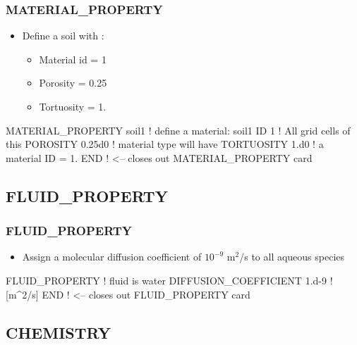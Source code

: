 \documentclass{beamer}
\newcommand\redcomment[1]{{{\color{red} #1}}}
\newcommand\bluecomment[1]{{{\color{blue} #1}}}
\newcommand\greencomment[1]{{{\color{green} #1}}}
\begin{document}
\begin{frame}\frametitle{MATERIAL\_PROPERTY}

\begin{itemize}
  \item Define a soil with :
  \begin{itemize}
    \item Material id = 1
    \item Porosity = 0.25
    \item Tortuosity = 1.
  \end{itemize}
\end{itemize}

\begin{semiverbatim}
MATERIAL_PROPERTY soil1  \bluecomment{! define a material:} \greencomment{soil1}
  ID 1                   \bluecomment{! All grid cells of this}
  POROSITY 0.25d0        \bluecomment{!   material type will have}
  TORTUOSITY 1.d0        \bluecomment{!   a material \redcomment{ID = 1}.}
END  \bluecomment{! <-- closes out MATERIAL\_PROPERTY card}
\end{semiverbatim}

\end{frame}

\subsection{FLUID\_PROPERTY}

\begin{frame}\frametitle{FLUID\_PROPERTY}

\begin{itemize}
  \item Assign a molecular diffusion coefficient of $10^{-9}$ m$^2$/s to all aqueous species
\end{itemize}

\begin{semiverbatim}

FLUID_PROPERTY                  \bluecomment{! fluid is water}
  DIFFUSION_COEFFICIENT 1.d-9   \bluecomment{! [m^2/s]}
END  \bluecomment{! <-- closes out FLUID\_PROPERTY card}
\end{semiverbatim}

\end{frame}

\subsection{CHEMISTRY}
\end{document}
